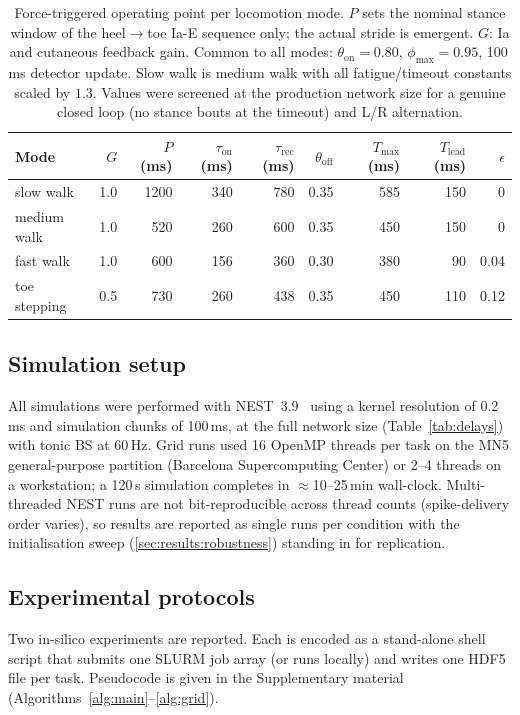 \begin{table}[t]
  \centering
  \footnotesize
  \caption{Force-triggered operating point per locomotion mode. $P$ sets
    the nominal stance window of the heel$\to$toe Ia-E sequence only; the
    actual stride is emergent. $G$: Ia and cutaneous feedback gain.
    Common to all modes: $\theta_{\text{on}}=0.80$, $\phi_{\max}=0.95$,
    100\,ms detector update. Slow walk is medium walk with all
    fatigue/timeout constants scaled by $1.3$. Values were screened at the
    production network size for a genuine closed loop (no stance bouts at
    the timeout) and L/R alternation.}
  \label{tab:modes}
  \begin{tabular}{l r r r r r r r r}
    \toprule
    Mode & $G$ & $P$ (ms) & $\tau_{\text{on}}$ (ms) & $\tau_{\text{rec}}$ (ms)
      & $\theta_{\text{off}}$ & $T_{\max}$ (ms) & $T_{\text{lead}}$ (ms) & $\epsilon$ \\
    \midrule
    slow walk     & 1.0 & 1200 & 340 & 780 & 0.35 & 585 & 150 & 0    \\
    medium walk   & 1.0 &  520 & 260 & 600 & 0.35 & 450 & 150 & 0    \\
    fast walk     & 1.0 &  600 & 156 & 360 & 0.30 & 380 &  90 & 0.04 \\
    toe stepping  & 0.5 &  730 & 260 & 438 & 0.35 & 450 & 110 & 0.12 \\
    \bottomrule
  \end{tabular}
\end{table}

\subsection{Simulation setup}\label{sec:methods:sim}
All simulations were performed with NEST~3.9~\cite{nest2002} using a
kernel resolution of 0.2\,ms and simulation chunks of 100\,ms, at the full
network size (Table~\ref{tab:delays}) with tonic BS at 60\,Hz. Grid runs
used 16 OpenMP threads per task on the MN5 general-purpose partition
(Barcelona Supercomputing Center) or 2--4 threads on a workstation; a
120\,s simulation completes in $\approx$10--25\,min wall-clock.
Multi-threaded NEST runs are not bit-reproducible across thread counts
(spike-delivery order varies), so results are reported as single runs per
condition with the initialisation sweep (\autoref{sec:results:robustness})
standing in for replication.

\subsection{Experimental protocols}\label{sec:methods:protocols}
Two in-silico experiments are reported. Each is encoded as a stand-alone
shell script that submits one SLURM job array (or runs locally) and writes
one HDF5 file per task. Pseudocode is given in the Supplementary material
(Algorithms~\ref{alg:main}--\ref{alg:grid}).

